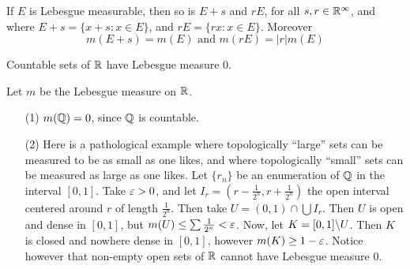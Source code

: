 \begin{theorem}\label{theorem_1.4.8}
    If $E$ is Lebesgue measurable, then so is  $E+s$ and $rE$, for all $s,r \in
    \mathbb{R}^\infty$, and where $E+s=\{x+s : x \in E\}$, and $rE=\{rx : x \in E\}$.
    Moreover
    \begin{equation*}
        m(E+s)=m(E) \text{ and } m(rE)=|r|m(E)
    \end{equation*}
\end{theorem}

\begin{theorem}\label{theorem_1.4.9}
    Countable sets of $\mathbb{R}$ have Lebesgue measure  $0$.
\end{theorem}

\begin{example}\label{example_1.3}
    Let $m$ be the Lebesgue measure on $\mathbb{R}$.
    \begin{enumerate}
        \item[(1)] $m(\mathbb{Q})=0$, since $\mathbb{Q}$ is countable.

        \item[(2)] Here is a pathological example where topologically ``large''
            sets can be measured to be as small as one likes, and where
            topologically ``small'' sets can be measured as large as one likes.
            Let $\{r_n\}$ be an enumeration of $\mathbb{Q}$ in the interval $[0,1]$.
            Take $\varepsilon>0$, and let  $I_r=(r-\frac{1}{2^n}, r+\frac{1}{2^n})$ the
            open interval centered around $r$ of length $\frac{1}{2^n}$. Then
            take $U=(0,1) \cap \bigcup{I_r}$. Then $U$ is open and dense in
            $[0,1]$, but $m(U) \leq \sum{\frac{1}{2^n}}<\varepsilon$. Now, let
            $K=[0,1] \backslash U$. Then $K$ is closed and nowhere dense in $[0,1]$,
            however $m(K) \geq 1-\varepsilon$. Notice however that non-empty open sets of
            $\mathbb{R}$ cannot have Lebesgue measure $0$.
    \end{enumerate}
\end{example}

